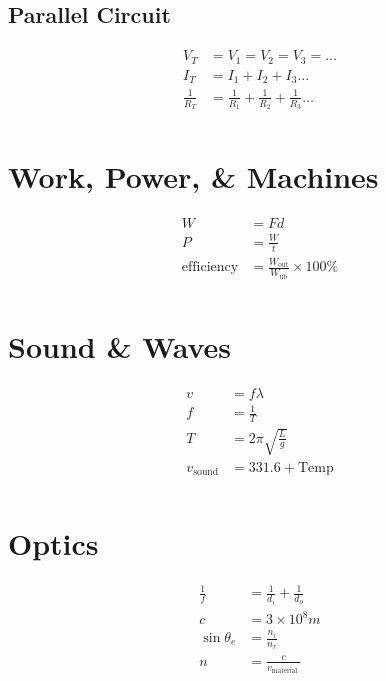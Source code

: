 \documentclass[10pt]{ctexart}
\begin{document}
\begin{multicols}{2}
    \subsection*{Parallel Circuit}

    \begin{align*}
        V_{T}           & = V_{1} = V_{2} = V_{3} = \ldots                             \\
        I_{T}           & = I_{1} + I_{2} + I_{3} \ldots                               \\
        \frac{1}{R_{T}} & = \frac{1}{R_{1}} + \frac{1}{R_{2}} + \frac{1}{R_{3}} \ldots \\
    \end{align*}

    \section{Work, Power, \& Machines}

    \begin{align*}
        W                 & = F d                                                    \\
        P                 & = \frac{W}{t}                                            \\
        \text{efficiency} & = \frac{W_{\text {out}}}{W_{\text {ub}}} \times 100 \% \\
    \end{align*}


    \section{Sound \& Waves}

    \begin{align*}
        v                 & = f \lambda                \\
        f                 & = \frac{1}{T}              \\
        T                 & = 2 \pi \sqrt{\frac{L}{g}} \\
        v_{\text {sound}} & = 331.6  + \text {Temp}    \\
    \end{align*}

    \section{Optics}

    \begin{align*}
        \frac{1}{f}     & = \frac{1}{d_{i}}+\frac{1}{d_{o}} \\
        c               & = 3 \times 10^{8} m               \\
        \sin \theta_{e} & = \frac{n_{i}}{n_{r}}             \\
        n               & = \frac{c}{v_{\text {material }}} \\
    \end{align*}
\end{multicols}
\end{document}
